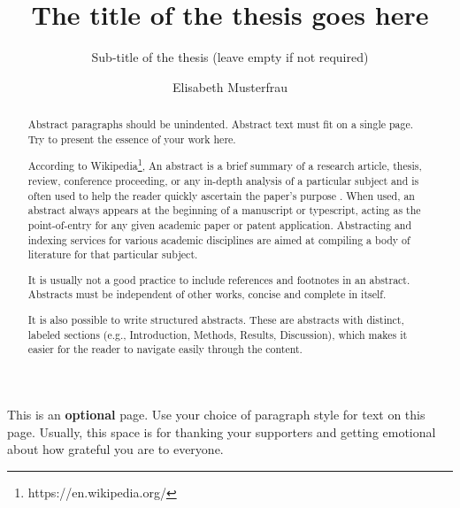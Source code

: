 \documentclass{imc-rai}
\title{The title of the thesis goes here}
\subtitle{Sub-title of the thesis (leave empty if not required)}
\author{Elisabeth Musterfrau}
\begin{document}
\frontmatter\maketitle{}


\begin{declarations}\end{declarations}



\begin{abstract}
	Abstract paragraphs should be unindented. Abstract text must fit on a single page. Try to present the essence of your work here. 
	
	According to Wikipedia\footnote{https://en.wikipedia.org/}, An abstract is a brief summary of a research article, thesis, review, conference proceeding, or any in-depth analysis of a particular subject and is often used to help the reader quickly ascertain the paper's purpose \cite{988366}. When used, an abstract always appears at the beginning of a manuscript or typescript, acting as the point-of-entry for any given academic paper or patent application. Abstracting and indexing services for various academic disciplines are aimed at compiling a body of literature for that particular subject.
	
	It is usually not a good practice to include references and footnotes in an abstract. Abstracts must be independent of other works, concise and complete in itself. 
	
	It is also possible to write structured abstracts. These are abstracts with distinct, labeled sections (e.g., Introduction, Methods, Results, Discussion), which makes it easier for the reader to navigate easily through the content. 
	
\end{abstract}


\begin{acknowledgements}
This is an \textbf{optional} page. Use your choice of paragraph style for text on this page. Usually, this space is for thanking your supporters and getting emotional about how grateful you are to everyone.  
\end{acknowledgements}

%
\tableofcontents%
\clearpage


%
\listoftables
\clearpage


%
\listoffigures
\clearpage


\mainmatter%
\end{document}
